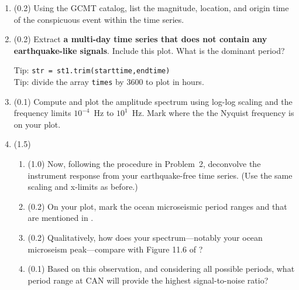 \documentclass[11pt,titlepage,fleqn]{article}
\begin{document}
\begin{enumerate}
\item (0.2) Using the GCMT catalog, list the magnitude, location, and origin time of the conspicuous event within the time series. 

\item (0.2) Extract {\bf a multi-day time series that does not contain any earthquake-like signals}. Include this plot. What is the dominant period?

Tip: \verb+str = st1.trim(starttime,endtime)+ \\
Tip: divide the array \verb+times+ by 3600 to plot in hours.

\item (0.1) Compute and plot the amplitude spectrum using log-log scaling and the frequency limits $10^{-4}$~Hz to $10^1$~Hz. Mark where the the Nyquist frequency is on your plot.

\item (1.5)

\begin{enumerate}
\item (1.0) Now, following the procedure in Problem~2, deconvolve the instrument response from your earthquake-free time series. (Use the same scaling and x-limits as before.)

%
%

\item (0.2) On your plot, mark the ocean microseismic period ranges  and  that are mentioned in \citet[][Section 11.2]{ShearerE2}.

\item (0.2) Qualitatively, how does your spectrum---notably your ocean microseism peak---compare with Figure 11.6 of \citet{ShearerE2}?

\item (0.1) Based on this observation, and considering all possible periods, what period range at CAN will provide the highest signal-to-noise ratio?

\end{enumerate}

\end{enumerate}

\end{document}
